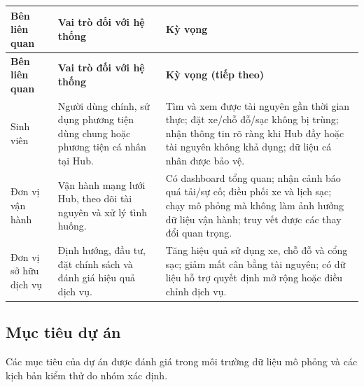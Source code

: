 {
\small
\setlength{\tabcolsep}{3pt}
\renewcommand{\arraystretch}{1.25}
\begin{longtable}{|>{\raggedright\arraybackslash}p{3.0cm}|>{\raggedright\arraybackslash}p{4.2cm}|>{\raggedright\arraybackslash}p{5.6cm}|}
\hline
\textbf{Bên liên quan} & \textbf{Vai trò đối với hệ thống} & \textbf{Kỳ vọng} \\
\hline
\endfirsthead
\hline
\textbf{Bên liên quan} & \textbf{Vai trò đối với hệ thống} & \textbf{Kỳ vọng (tiếp theo)} \\
\hline
\endhead
Sinh viên & Người dùng chính, sử dụng phương tiện dùng chung hoặc phương tiện cá nhân tại Hub. & Tìm và xem được tài nguyên gần thời gian thực; đặt xe/chỗ đỗ/sạc không bị trùng; nhận thông tin rõ ràng khi Hub đầy hoặc tài nguyên không khả dụng; dữ liệu cá nhân được bảo vệ. \\
\hline
Đơn vị vận hành & Vận hành mạng lưới Hub, theo dõi tài nguyên và xử lý tình huống. & Có dashboard tổng quan; nhận cảnh báo quá tải/sự cố; điều phối xe và lịch sạc; chạy mô phỏng mà không làm ảnh hưởng dữ liệu vận hành; truy vết được các thay đổi quan trọng. \\
\hline
Đơn vị sở hữu dịch vụ & Định hướng, đầu tư, đặt chính sách và đánh giá hiệu quả dịch vụ. & Tăng hiệu quả sử dụng xe, chỗ đỗ và cổng sạc; giảm mất cân bằng tài nguyên; có dữ liệu hỗ trợ quyết định mở rộng hoặc điều chỉnh dịch vụ. \\
\hline
\end{longtable}
}

\subsection{Mục tiêu dự án}

Các mục tiêu của dự án được đánh giá trong môi trường dữ liệu mô phỏng và các kịch bản kiểm thử do nhóm xác định.

